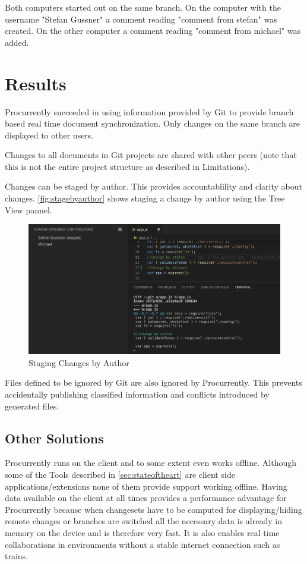 Both computers started out on the same branch. On the computer with the username "Stefan Gussner" a comment reading "comment from stefan" was created. On the other computer a comment reading "comment from michael" was added.

\section{Results}
Procurrently succeeded in using information provided by Git to provide branch based real time document synchronization. Only changes on the same branch are displayed to other users.

Changes to all documents in Git projects are shared with other peers (note that this is not the entire project structure as described in Limitations).

Changes can be staged by author. This provides accountablility and clarity about changes. \autoref{fig:stagebyauthor} shows staging a change by author using the Tree View pannel. 

\begin{figure}[hb]
    \centering
    \includegraphics[width=150mm]{figures/screenshots/stage-by-author.png}
	\caption{Staging Changes by Author}
    \label{fig:stagebyauthor}
\end{figure}

Files defined to be ignored by Git are also ignored by Procurrently. This prevents accidentally publishing classified information and conflicts introduced by generated files. 

\subsection{Other Solutions}
Procurrently runs on the client and to some extent even works offline. Although some of the Tools described in \autoref{sec:stateoftheart} are client side applications/extensions none of them provide support working offline. Having data available on the client at all times provides a performance advantage for Procurrently because when changesets have to be computed for displaying/hiding remote changes or branches are switched all the necessary data is already in memory on the device and is therefore very fast. It is also enables real time collaborations in environments without a stable internet connection such as trains.

